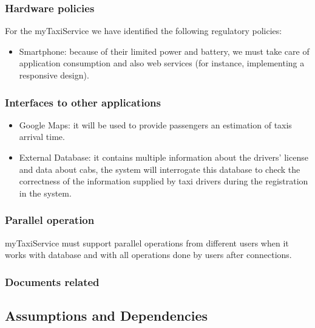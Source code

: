 \documentclass[a4paper,12pt,dvipsnames]{article}%
\begin{document}
\subsubsection{Hardware policies}
For the myTaxiService we have identified the following regulatory policies:
\begin{itemize}
\item Smartphone: because of their limited power and battery, we must take care of application consumption and also web services (for instance, implementing a responsive design).
\end{itemize}
\subsubsection{Interfaces to other applications}
\begin{itemize}
\item Google Maps: it will be used to provide passengers an estimation of taxis arrival time.
\item External Database: it contains multiple information about the drivers' license and data about cabs, the system will interrogate this database to check the correctness of the information supplied by taxi drivers during the registration in the system.
\end{itemize} 
\subsubsection{Parallel operation}
myTaxiService must support parallel operations from different users when it works
with database and with all operations done by users after connections.
\subsubsection{Documents related}
\subsection{Assumptions and Dependencies}
\end{document}
